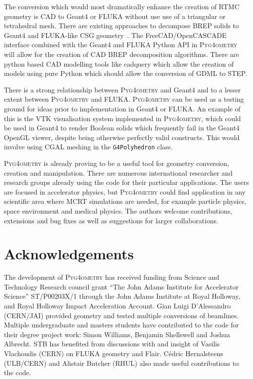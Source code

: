 \documentclass[final,5p,times,twocolumn]{elsarticle}
\newcommand{\pyinline}[1]{\lstinline[postbreak={}]{#1}}
\newcommand{\PYGEOMETRY}{\textsc{Pyg4ometry}}
\begin{document}
The conversion which would most dramatically enhance the creation of RTMC geometry is CAD to Geant4 or FLUKA
without use use of a triangular or tetrahedral mesh. There are existing approaches to decompose BREP solids to Geant4 and 
FLUKA-like CSG geometry~\cite{WangNuclSciTech31-82-2020, LuFusionEngineeringAndDesign124-2017}. 
The FreeCAD/OpenCASCADE interface combined with the Geant4 and FLUKA Python API in \PYGEOMETRY{} 
will allow for the creation of CAD BREP decomposition algorithms. There are python based CAD modelling tools like 
cadquery \cite{cadquery} which allow the creation of models using pure Python which should allow the conversion of GDML to STEP. 

There is a strong relationship between \PYGEOMETRY{} and Geant4 and to a lesser extent between 
\PYGEOMETRY{} and FLUKA. \PYGEOMETRY{} can be used as a testing ground for ideas prior to 
implementation in Geant4 or FLUKA. An example of this is the VTK visualisation system implemented in 
\PYGEOMETRY{}, which could be used in Geant4 to render Boolean solids which frequently 
fail in the Geant4 OpenGL viewer, despite being otherwise perfectly valid constructs.
This would involve using CGAL meshing in the \pyinline{G4Polyhedron} class. %

\PYGEOMETRY{} is already proving to be a useful tool for geometry conversion, creation and manipulation.
There are numerous international researcher and research groups already using the code for their particular applications.
The users are focused in accelerator physics, but \PYGEOMETRY{} could find application in any scientific
area where MCRT simulations are needed, for example particle physics, space environment and medical physics.
The authors welcome contributions, extensions and bug fixes as well as suggestions for larger collaborations.

\section{Acknowledgements}

The development of \PYGEOMETRY{} has received funding from Science and
Technology Research council grant ``The John Adams Institute for
Accelerator Science'' ST/P00203X/1 through the John Adams Institute at
Royal Holloway, and Royal Holloway Impact Acceleration Account. Gian Luigi D'Alessandro (CERN/JAI)
provided geometry and tested multiple conversions of beamlines. Multiple
undergraduate and masters students have contributed to the code for their
degree project work: Simon Williams, Benjamin Shellswell and Joshua Albrecht.
STB has benefited from discussions with and insight of Vasilis Vlachoudis
(CERN) on FLUKA geometry and Flair.  Cédric Hernalsteens (ULB/CERN) and
Alistair Butcher (RHUL) also made useful contributions to the code.
\end{document}
